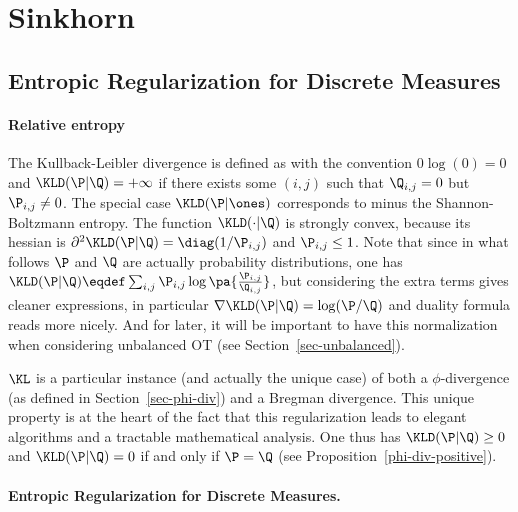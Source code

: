 

\section{Sinkhorn}

\subsection{Entropic Regularization for Discrete Measures}


\paragraph{Relative entropy}

The Kullback-Leibler divergence is defined as
with the convention $0\log(0)=0$ and $\KLD(\P|\Q)=+\infty$ if there exists some $(i,j)$ such that $\Q_{i,j}=0$ but $\P_{i,j} \neq 0$. 
%
The special case $\KLD(\P|\ones)$ corresponds to minus the Shannon-Boltzmann entropy. 
%
The function $\KLD(\cdot|\Q)$ is strongly convex, because its hessian is $\partial^2 \KLD(\P|\Q)=\diag(1/\P_{i,j})$ and $\P_{i,j} \leq 1$. 
%
Note that since in what follows $\P$ and $\Q$ are actually probability distributions, one has $\KLD(\P|\Q) \eqdef \sum_{i,j}  \P_{i,j} \log\pa{\frac{\P_{i,j}}{\Q_{i,j}}}$, but considering the extra terms gives cleaner expressions, in particular $\nabla \KLD(\P|\Q) = \log(\P/\Q)$ and duality formula reads more nicely. And for later, it will be important to have this normalization when considering unbalanced OT (see Section~\ref{sec-unbalanced}).

$\KL$ is a particular instance (and actually the unique case) of both a $\phi$-divergence (as defined in Section~\ref{sec-phi-div}) and a Bregman divergence. This unique property is at the heart of the fact that this regularization leads to elegant algorithms and a tractable mathematical analysis. One thus has $\KLD(\P|\Q) \geq 0$ and  $\KLD(\P|\Q)=0$ if and only if $\P=\Q$ (see Proposition~\ref{phi-div-positive}).


\paragraph{Entropic Regularization for Discrete Measures.}

